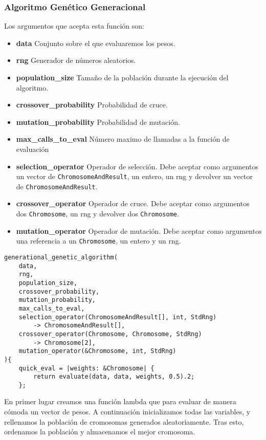 \documentclass[size=a4, parskip=half, titlepage=false, toc=flat, toc=bib, 12pt]{scrartcl}
\begin{document}
\subsubsection{Algoritmo Genético Generacional}
Los argumentos que acepta esta función son:
\begin{itemize}
    \item \textbf{data} Conjunto sobre el que evaluaremos los pesos.
    \item \textbf{rng} Generador de números aleatorios.
    \item \textbf{population\_size} Tamaño de la población durante la ejecución del algoritmo.
    \item \textbf{crossover\_probability} Probabilidad de cruce.
    \item \textbf{mutation\_probability} Probabilidad de mutación.
    \item \textbf{max\_calls\_to\_eval} Número maximo de llamadas a la función de evaluación
    \item \textbf{selection\_operator} Operador de selección. Debe aceptar como argumentos un vector de \texttt{ChromosomeAndResult}, un entero, un rng y devolver un vector de \texttt{ChromosomeAndResult}.
    \item \textbf{crossover\_operator} Operador de cruce. Debe aceptar como argumentos dos \texttt{Chromosome}, un rng y devolver dos \texttt{Chromosome}.
    \item \textbf{mutation\_operator} Operador de mutación. Debe aceptar como argumentos una referencia a un \texttt{Chromosome}, un entero y un rng.
\end{itemize}
\begin{verbatim}
generational_genetic_algorithm(
    data,
    rng,
    population_size,
    crossover_probability,
    mutation_probability,
    max_calls_to_eval,
    selection_operator(ChromosomeAndResult[], int, StdRng)
        -> ChromosomeAndResult[],
    crossover_operator(Chromosome, Chromosome, StdRng)
        -> Chromosome[2],
    mutation_operator(&Chromosome, int, StdRng)
){
    quick_eval = |weights: &Chromosome| {
        return evaluate(data, data, weights, 0.5).2;
    };
\end{verbatim}

En primer lugar creamos una función lambda que para evaluar de manera cómoda un vector de pesos.
A continuación inicializamos todas las variables, y rellenamos la población de cromosomas generados aleatoriamente. Tras esto, ordenamos la población y almacenamos el mejor cromosoma.
\end{document}
